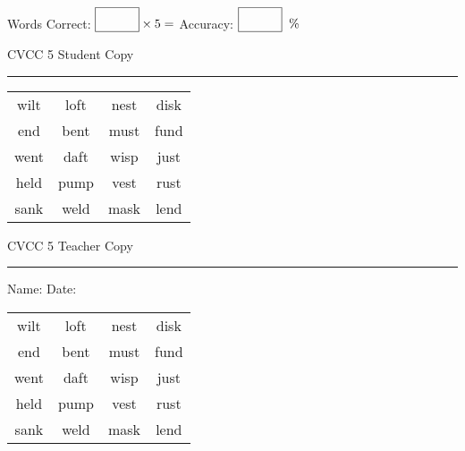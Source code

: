 \documentclass{memoir}
\begin{document}
\small

Words Correct: $\fbox{\phantom{\huge 100}} \times 5 = $ Accuracy: $\fbox{\phantom{\huge 100}}\;\; \%$ 

\vfill

\newpage


\footnotesize \noindent
CVCC 5 \hfill Student Copy
\smallskip
\hrule

\Large

\setlength{\tabcolsep}{14pt}
\def\arraystretch{3}

{\selectfont


\begin{vplace}[0.5]
\begin{center}
\begin{tabular}{cccc}
wilt & loft & nest & disk \\
end & bent & must & fund \\
went & daft & wisp & just \\
held & pump & vest & rust \\
sank & weld & mask & lend \\
\end{tabular}
\end{center}
\end{vplace}

}

\newpage

\footnotesize \noindent
CVCC 5 \hfill Teacher Copy
\smallskip
\hrule

\small

\vfill

\noindent
Name: \underline{\hspace{1.75in}} \hfill Date: \underline{\hspace{1in}}

\Large

{\selectfont


\begin{vplace}[0.5]
\begin{center}
\begin{tabular}{cccc}
wilt & loft & nest & disk \\
end & bent & must & fund \\
went & daft & wisp & just \\
held & pump & vest & rust \\
sank & weld & mask & lend \\
\end{tabular}
\end{center}
\end{vplace}



}
\end{document}
